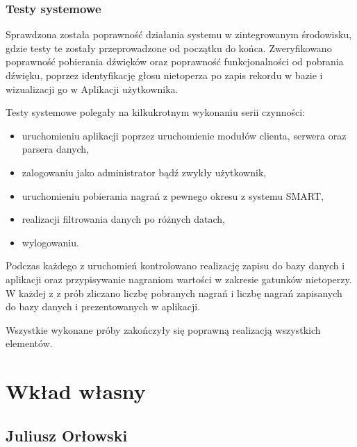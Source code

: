 \documentclass{sprz}
\begin{document}
\subsection{Testy systemowe}
Sprawdzona została poprawność działania systemu w zintegrowanym środowisku, gdzie testy te zostały przeprowadzone od początku do końca. Zweryfikowano poprawność pobierania dźwięków oraz poprawność funkcjonalności od pobrania dźwięku, poprzez identyfikację głosu nietoperza po zapis rekordu w bazie i wizualizacji go w Aplikacji użytkownika.

Testy systemowe polegały na kilkukrotnym wykonaniu serii czynności:

\begin{itemize}
  \item uruchomieniu aplikacji poprzez uruchomienie modułów clienta, serwera oraz parsera danych,
  \item zalogowaniu jako administrator bądź zwykły użytkownik,
  \item uruchomieniu pobierania nagrań z pewnego okresu z systemu SMART,
  \item realizacji filtrowania danych po różnych datach,
  \item wylogowaniu.
\end{itemize}

Podczas każdego z uruchomień kontrolowano realizację zapisu do bazy danych i aplikacji oraz przypisywanie nagraniom wartości w zakresie gatunków nietoperzy.
W każdej z z prób zliczano liczbę pobranych nagrań i liczbę nagrań zapisanych do bazy danych i prezentowanych w aplikacji.


Wszystkie wykonane próby zakończyły się poprawną realizacją wszystkich elementów.

\chapter{Wkład własny}

\section{Juliusz Orłowski}
\end{document}
